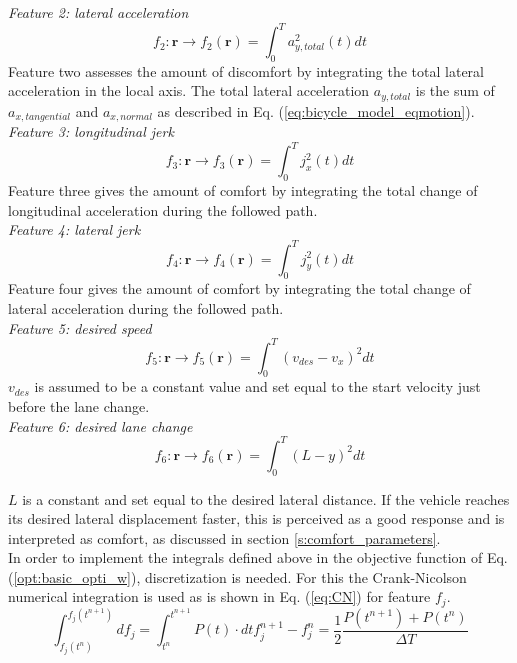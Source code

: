 \textit{Feature 2: lateral acceleration}
\begin{equation}\label{eq:flat_acc}
f_{2}:\bm{r}\xrightarrow{}f_2(\bm{r})=\int_{0}^{T}a_{y,total}^{2}(t) dt
\end{equation}
Feature two assesses the amount of discomfort by integrating the total lateral acceleration in the local axis. The total lateral acceleration  $a_{y,total} $ is the sum of  $ a_{x,tangential}$ and $a_{x,normal}$ as described in Eq. (\ref{eq:bicycle_model_eqmotion}).\\

\textit{Feature 3: longitudinal jerk}
\begin{equation}\label{eq:flong_jerk}
f_{3}:\bm{r}\xrightarrow{}f_3(\bm{r})=\int_{0}^{T}j_{x}^{2}(t) dt
\end{equation}
Feature three gives the amount of comfort by integrating the total change of longitudinal acceleration during the followed path. \\

\textit{Feature 4: lateral jerk}
\begin{equation}\label{eq:flat_jerk}
f_{4}:\bm{r}\xrightarrow{}f_4(\bm{r})=\int_{0}^{T}j_y^{2}(t) dt
\end{equation}
Feature four gives the amount of comfort by integrating the total change of lateral acceleration during the followed path. \\

\textit{Feature 5: desired speed}
\begin{equation}\label{eq:des_speed}
f_{5}:\bm{r}\xrightarrow{}f_5(\bm{r})=\int_{0}^{T}(v_{des}-v_x)^2 dt
\end{equation}
$v_{des}$ is assumed to be a constant value and set equal to the start velocity just before the lane change.\\

\textit{Feature 6: desired lane change}
\begin{equation}\label{eq:des_lane_change}
f_{6}:\bm{r}\xrightarrow{}f_6(\bm{r})=\int_{0}^{T}(L-y)^2 dt
\end{equation}

$L$ is a constant and set equal to the desired lateral distance. If the vehicle reaches its desired lateral displacement faster, this is perceived as a good response and is interpreted as comfort, as discussed in section \ref{s:comfort_parameters}.\\

In order to implement the integrals defined above in the objective function of Eq. (\ref{opt:basic_opti_w}), discretization is needed. For this the Crank-Nicolson numerical integration is used as is shown in Eq. (\ref{eq:CN}) for feature $f_j$. 
\begin{subequations}\label{eq:CN}
	\begin{equation}
	\int_{f_j(t^n)}^{f_j(t^{n+1})}df_j=\int_{t^n}^{t^{n+1}} P(t) \cdot dt	
	\end{equation}
	\begin{equation}
	f_j^{n+1} -f_j^{n} = \frac{1}{2}\frac{P(t^{n+1})+P(t^n)}{\Delta T}
	\end{equation}
\end{subequations}\\

